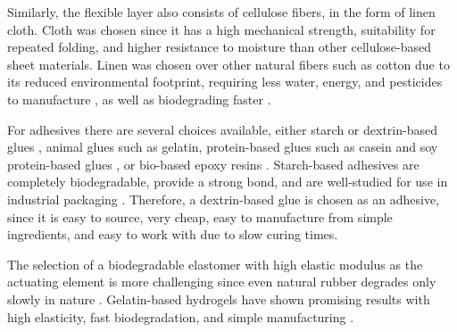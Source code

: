 Similarly, the flexible layer also consists of cellulose fibers, in the form of linen cloth. Cloth was chosen since it has a high mechanical strength, suitability for repeated folding, and higher resistance to moisture than other cellulose-based sheet materials. Linen was chosen over other natural fibers such as cotton due to its reduced environmental footprint, requiring less water, energy, and pesticides to manufacture \cite{VanDerVelden2014LCAElastane, Shen2010EnvironmentalFibres}, as well as biodegrading faster \cite{Arshad2014}.

For adhesives there are several choices available, either starch or dextrin-based glues \cite{Radley1976}, animal glues such as gelatin, protein-based glues such as casein \cite{Bye1990} and soy protein-based glues \cite{Liu2002}, or bio-based epoxy resins \cite{Bassett2016}.
Starch-based adhesives are completely biodegradable, provide a strong bond, and are well-studied for use in industrial packaging \cite{Maurer2009, Radley1976}. Therefore, a dextrin-based glue is chosen as an adhesive, since it is easy to source, very cheap, easy to manufacture from simple ingredients,  and easy to work with due to slow curing times.

The selection of a biodegradable elastomer with high elastic modulus as the actuating element is more challenging since even natural rubber degrades only slowly in nature \cite{Mahmoud2021ImprovementMonomers}. Gelatin-based hydrogels have shown promising results with high elasticity, fast biodegradation, and simple manufacturing \cite{Baumgartner2020, Hardman2022, Hardman20213DStructures, Shintake2017}.

    
